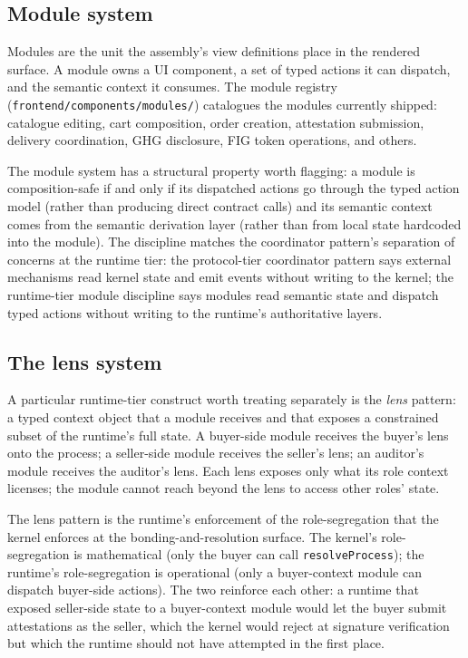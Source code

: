 \documentclass[11pt,a4paper]{article}
\theoremstyle{definition}
\theoremstyle{remark}
\begin{document}
\subsection{Module system}

Modules are the unit the assembly's view definitions place in the
rendered surface. A module owns a UI component, a set of typed
actions it can dispatch, and the semantic context it consumes. The
module registry (\texttt{frontend/components/modules/}) catalogues
the modules currently shipped: catalogue editing, cart composition,
order creation, attestation submission, delivery coordination, GHG
disclosure, FIG token operations, and others.

The module system has a structural property worth flagging: a module
is composition-safe if and only if its dispatched actions go through
the typed action model (rather than producing direct contract calls)
and its semantic context comes from the semantic derivation layer
(rather than from local state hardcoded into the module). The
discipline matches the coordinator pattern's separation of concerns
at the runtime tier: the protocol-tier coordinator pattern says
external mechanisms read kernel state and emit events without writing
to the kernel; the runtime-tier module discipline says modules read
semantic state and dispatch typed actions without writing to the
runtime's authoritative layers.

\subsection{The lens system}

A particular runtime-tier construct worth treating separately is the
\emph{lens} pattern: a typed context object that a module receives
and that exposes a constrained subset of the runtime's full state.
A buyer-side module receives the buyer's lens onto the process; a
seller-side module receives the seller's lens; an auditor's module
receives the auditor's lens. Each lens exposes only what its role
context licenses; the module cannot reach beyond the lens to access
other roles' state.

The lens pattern is the runtime's enforcement of the role-segregation
that the kernel enforces at the bonding-and-resolution surface. The
kernel's role-segregation is mathematical (only the buyer can call
\texttt{resolveProcess}); the runtime's role-segregation is
operational (only a buyer-context module can dispatch buyer-side
actions). The two reinforce each other: a runtime that exposed
seller-side state to a buyer-context module would let the buyer
submit attestations as the seller, which the kernel would reject at
signature verification but which the runtime should not have
attempted in the first place.
\end{document}
